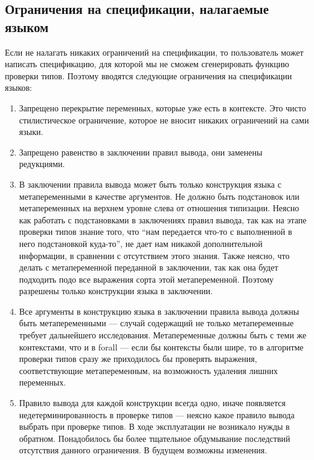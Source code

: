 \subsection{Ограничения на спецификации, налагаемые языком}\label{constraints}

Если не налагать никаких ограничений на спецификации, то пользователь может написать спецификацию, для которой мы не сможем сгенерировать функцию проверки типов. Поэтому вводятся следующие ограничения на спецификации языков:

\begin{enumerate}
\item Запрещено перекрытие переменных, которые уже есть в контексте. Это чисто стилистическое ограничение, которое не вносит никаких ограничений на сами языки.

\item Запрещено равенство в заключении правил вывода, они заменены редукциями.

\item В заключении правила вывода может быть только конструкция языка с метапеременными в качестве аргументов. Не должно быть подстановок или метапеременных на верхнем уровне слева от отношения типизации. Неясно как работать с подстановками в заключениях правил вывода, так как на этапе проверки типов знание того, что ``нам передается что-то с выполненной в него подстановкой куда-то'', не дает нам никакой дополнительной информации, в сравнении с отсутствием этого знания. Также неясно, что делать с метапеременной переданной в заключении, так как она будет подходить подо все выражения сорта этой метапеременной. Поэтому разрешены только конструкции языка в заключении.

\item Все аргументы в конструкцию языка в заключении правила вывода должны быть метапеременными --- случай содержащий не только метапеременные требует дальнейшего исследования. Метапеременные должны быть с теми же контекстами, что и в forall --- если бы контексты были шире, то в алгоритме проверки типов сразу же приходилось бы проверять выражения, соответствующие метапеременным, на возможность удаления лишних переменных.

\item \label{one_per_fun} Правило вывода для каждой конструкции всегда одно, иначе появляется недетерминированность в проверке типов --- неясно какое правило вывода выбрать при проверке типов. В ходе эксплуатации не возникало нужды в обратном. Понадобилось бы более тщательное обдумывание последствий отсутствия данного ограничения. В будущем возможны изменения.


\end{enumerate}
